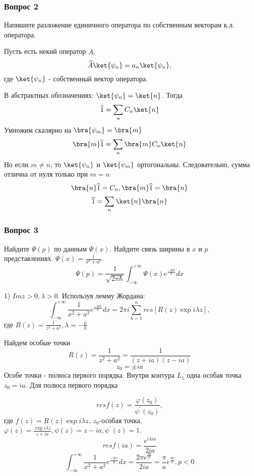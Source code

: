 \subsubsection{Вопрос 2}
Напишите разложение единичного оператора по собственным векторам к.л. оператора.

Пусть есть некий оператор $\widehat{A}$.
$$\widehat{A}\ket{\psi_n} = a_n \ket{\psi_n},$$
где $\ket{\psi_n}$ - собственный вектор оператора.

В абстрактных обозначениях: $\ket{\psi_n} = \ket{n}$. Тогда
$$\widehat{1}=\sum_n C_n \ket{n}$$
Умножим скалярно на $\bra{\psi_m} = \bra{m}$
$$\bra{m} \widehat{1}=\sum_n \bra{m} C_n \ket{n}$$
Но если $m\neq n$, то $\ket{\psi_n}$ и $\ket{\psi_m}$ ортогональны. Следовательно, сумма отлична от нуля только при $m=n$ 
$$\bra{n} \widehat{1}=C_n, \bra{m}\widehat{1}=\bra{n}$$
$$\widehat{1}=\sum_n \ket{n} \bra{n}$$

\subsubsection{Вопрос 3}
Найдите $\Psi(p)$ по данным $\Psi(x)$. Найдите связь ширины в $x$ и $p$ представлениях. $\Psi(x)=\frac{1}{x^2+a^2}$.
$$\Psi(p)=\frac{1}{\sqrt{2\pi \hbar}} \int_{-\infty}^{+\infty} \Psi(x) e^{\frac{-ipx}{\hbar}}dx$$

1) $Im z>0, \lambda >0$. Используя лемму Жордана:
$$\int_{-\infty}^{+\infty} \frac{1}{x^2+a^2} e^{\frac{-ipx}{\hbar}}dx=2\pi i \sum_{k=1}^n res [R(z)\exp{i \lambda z}],$$
где $R(z)=\frac{1}{z^2+a^2}, \lambda=-\frac{p}{\hbar}$ 

Найдем особые точки 
$$R(z)= \frac{1}{z^2+a^2} = \frac{1}{(z+ia)(z-ia)}$$
$$z_0=\pm ia$$
Особе точки - полюса первого порядка. Внутри контура $L_1$ одна особая точка $z_0=ia$. Для полюса первого порядка


$$res f(z) = \frac{\varphi(z_0)}{\psi^{'}(z_0)},$$
где $f(z)=R(z)\exp{i \lambda z}$, $z_0$-особая точка, $\varphi(z)=\frac{\exp{i \lambda z}}{z+ia}, \psi(z)=z-ia, \psi^{'}(z)=1$.
$$res f(ia) = \frac{e^{i \lambda i a}}{2ia}$$
$$\int_{-\infty}^{+\infty} \frac{1}{x^2+a^2} e^{\frac{-ipx}{\hbar}}dx=\frac{2\pi e^{\frac{ap}{\hbar}}}{2ia}=\frac{\pi}{a} e^{\frac{ap}{\hbar}}, p<0$$

